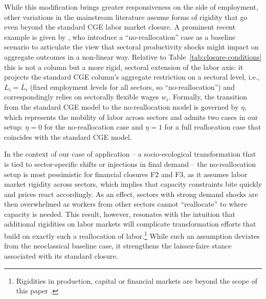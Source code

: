 While this modification brings greater responsiveness on the side of employment, other variations in the mainstream literature assume forms of rigidity that go even beyond the standard CGE labor market closure. A prominent recent example is given by \citet{BF2019}, who introduce a ``no-reallocation'' case as a baseline scenario to articulate the view that sectoral productivity shocks might impact on aggregate outcomes in a non-linear way. Relative to Table~\ref{tab:closure-conditions} this is not a column but
a more rigid, sectoral extension of the labor axis: it projects the standard CGE column's aggregate restriction on a sectoral level, i.e., $ L_i = \bar L_i$ (fixed employment levels for all sectors, so ``no-reallocation'') and correspondingly relies on sectorally flexible wages $w_i$. Formally, the transition from the standard CGE model to the no-reallocation model is governed by $\eta$, which represents the mobility of labor across sectors and admits two cases in our setup: $\eta=0$ for the no-reallocation case and $\eta=1$ for a full reallocation case that coincides with the standard CGE model.

In the context of our case of application -- a socio-ecological transformation that is tied to sector-specific shifts or injections in final demand -- the no-reallocation setup is most pessimistic for financial closures F2 and F3, as it assumes labor market rigidity across sectors, which implies that capacity constraints bite quickly and prices react accordingly. As an effect, sectors with strong demand shocks are then overwhelmed as workers from other sectors cannot ``reallocate'' to where capacity is needed. This result, however, resonates with the intuition that additional rigidities on labor markets will complicate transformation efforts that build on exactly such a reallocation of labor.\footnote{Rigidities in production, capital or financial markets are beyond the scope of this paper \citep[see, however,][]{BF2022, BernankeGertlerGilchrist.1999}.} While such an assumption deviates from the neoclassical baseline case, it strengthens the laissez-faire stance associated with its standard closure. 

